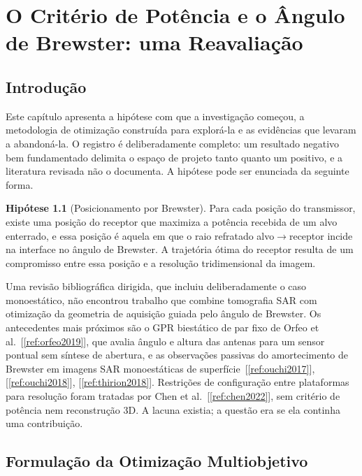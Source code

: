 \documentclass[12pt,a4paper,oneside]{book}
\theoremstyle{remark}
\newcommand{\citar}[1]{[\ref{ref:#1}]}
\theoremstyle{plain}
\theoremstyle{definition}
\newtheorem{hipotese}{Hipótese}[chapter]
\begin{document}
\chapter{O Critério de Potência e o Ângulo de Brewster: uma Reavaliação}
\label{cap:potencia}

\section{Introdução}
\label{sec:pot_intro}

Este capítulo apresenta a hipótese com que a investigação começou, a
metodologia de otimização construída para explorá-la e as evidências que levaram
a abandoná-la. O registro é deliberadamente completo: um resultado negativo bem
fundamentado delimita o espaço de projeto tanto quanto um positivo, e a
literatura revisada não o documenta. A hipótese pode ser enunciada da seguinte
forma.

\begin{hipotese}[Posicionamento por Brewster]
\label{hip:brewster}
Para cada posição do transmissor, existe uma posição do receptor que maximiza a
potência recebida de um alvo enterrado, e essa posição é aquela em que o raio
refratado alvo$\to$receptor incide na interface no ângulo de Brewster. A
trajetória ótima do receptor resulta de um compromisso entre essa posição e a
resolução tridimensional da imagem.
\end{hipotese}

Uma revisão bibliográfica dirigida, que incluiu deliberadamente o caso
monoestático, não encontrou trabalho que combine tomografia SAR com otimização
da geometria de aquisição guiada pelo ângulo de Brewster. Os antecedentes mais
próximos são o GPR biestático de par fixo de Orfeo et al.~\citar{orfeo2019},
que avalia ângulo e altura das antenas para um sensor pontual sem síntese de
abertura, e as observações passivas do amortecimento de Brewster em imagens SAR
monoestáticas de superfície~\citar{ouchi2017}, \citar{ouchi2018}, \citar{thirion2018}.
Restrições de configuração entre plataformas para resolução foram tratadas por
Chen et al.~\citar{chen2022}, sem critério de potência nem reconstrução 3D. A
lacuna existia; a questão era se ela continha uma contribuição.

\section{Formulação da Otimização Multiobjetivo}
\label{sec:otim_form}
\end{document}
